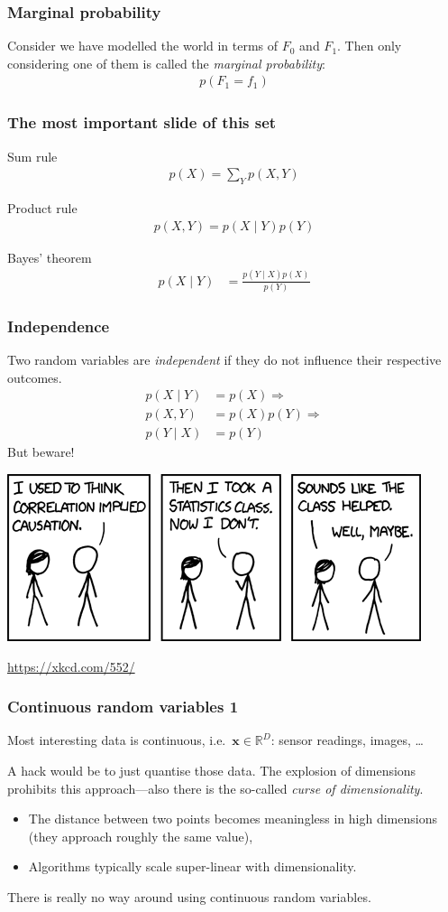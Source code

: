 \documentclass[USenglish,pdftex,compress,10pt,svgnamesi,handout]{beamer}
\def\Vec#1{\textbf{#1}}
\newcommand{\eq}[1]{\begin{align*}#1\end{align*}}
\begin{document}
\begin{frame}
\frametitle{Marginal probability}
Consider we have modelled the world in terms of $F_0$ and $F_1$.
Then only considering one of them is called the \emph{marginal probability}:
\eq{p(F_1=f_1)}
\end{frame}


\begin{frame}
\frametitle{The most important slide of this set}
\begin{block}{Sum rule}
\eq{
    p(X) = \sum_Y p(X, Y)
}
\end{block}

\begin{block}{Product rule}
\eq{
    p(X, Y) = p(X\mid Y)p(Y)
}
\end{block}

\begin{block}{Bayes' theorem}
\eq{
    p(X\mid Y) &= \frac{p(Y\mid X)p(X)}{p(Y)}
}
\end{block}
\end{frame}


\begin{frame}
\frametitle{Independence}
Two random variables are \emph{independent} if they do not influence their respective outcomes.
\eq{
    p(X\mid Y) &= p(X)  \Rightarrow  \\
    p(X, Y) &= p(X)p(Y) \Rightarrow \\
    p(Y\mid X) &= p(Y)
}
But beware!
\medskip

\pause
{\center
\includegraphics[width=.6\linewidth]{pics/correlation}
\medskip

\url{https://xkcd.com/552/}
}
\end{frame}


\begin{frame}
\frametitle{Continuous random variables 1}
Most interesting data is continuous, i.e.\ $\Vec{x} \in \mathbb{R}^D$: sensor readings, images, \dots

A hack would be to just quantise those data. The explosion of dimensions prohibits this approach---also there is the so-called \emph{curse of dimensionality}.
\begin{itemize}
    \item The distance between two points becomes meaningless in high dimensions (they approach roughly the same value),
    \item Algorithms typically scale super-linear with dimensionality.
\end{itemize}
\medskip

There is really no way around using continuous random variables.
\end{frame}
\end{document}
